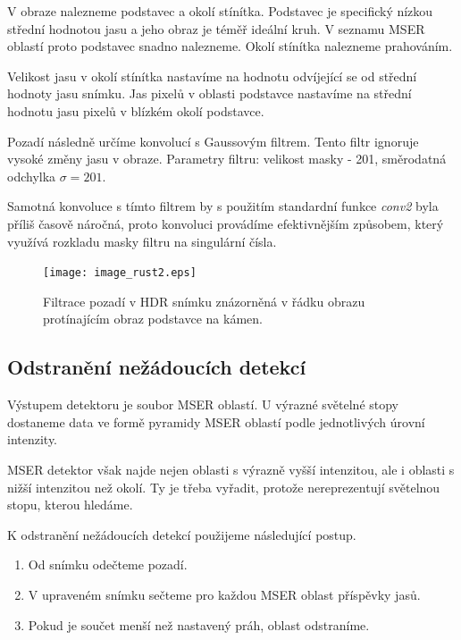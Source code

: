 	V obraze nalezneme podstavec a okolí stínítka. Podstavec je specifický nízkou střední hodnotou jasu a jeho obraz je téměř ideální kruh. V seznamu MSER oblastí proto podstavec snadno nalezneme. Okolí stínítka nalezneme prahováním. 
	
	Velikost jasu v okolí stínítka nastavíme na hodnotu odvíjející se od střední hodnoty jasu snímku. Jas pixelů v oblasti podstavce nastavíme na střední hodnotu jasu pixelů v blízkém okolí podstavce.  
	
	Pozadí následně určíme konvolucí s Gaussovým filtrem. Tento filtr ignoruje vysoké změny jasu v obraze. Parametry filtru: velikost masky - \SI{201}{\px}, směrodatná odchylka $\sigma = 201$.
	
	Samotná konvoluce s tímto filtrem by s použitím standardní funkce \textit{conv2} byla příliš časově náročná, proto konvoluci provádíme efektivnějším způsobem, který využívá rozkladu masky filtru na singulární čísla.
	
\begin{figure}[htbp]
    \centering\texttt{[image: image\_rust2.eps]}
     \caption[Filtrace pozadí.]{Filtrace pozadí v HDR snímku znázorněná v řádku obrazu protínajícím obraz podstavce na kámen.}
        \label{fig:pozadi}
\end{figure}
	      
\subsection{Odstranění nežádoucích detekcí}

Výstupem detektoru je soubor MSER oblastí. U výrazné světelné stopy dostaneme data ve formě pyramidy MSER oblastí podle jednotlivých úrovní intenzity. 

MSER detektor však najde nejen oblasti s výrazně vyšší intenzitou, ale i oblasti s nižší intenzitou než okolí. Ty je třeba vyřadit, protože nereprezentují světelnou stopu, kterou hledáme. 

K odstranění nežádoucích detekcí použijeme následující postup. 
\begin{enumerate}
\item Od snímku odečteme pozadí.

\item V upraveném snímku sečteme pro každou MSER oblast příspěvky jasů. 

\item Pokud je součet menší než nastavený práh, oblast odstraníme.  
\end{enumerate}
 	      


